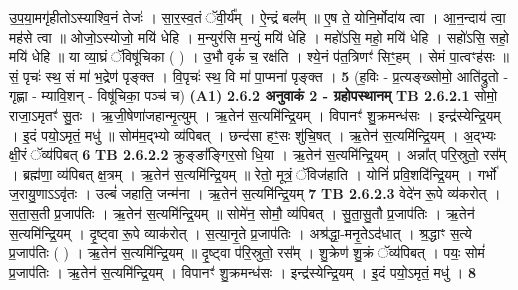 \documentclass[17pt]{extarticle}
\begin{document}
                  उ॒प॒या॒मगृ॑हीतोऽस्याश्वि॒नं तेजः॑ । सा॒र॒स्व॒तं ॅवी॒र्य᳚म् । ऐ॒न्द्रं बल᳚म् ॥ ए॒ष ते॒ योनि॒र्मोदा॑य त्वा । आ॒न॒न्दाय॑ त्वा॒ मह॑से त्वा ॥ ओजो॒ऽस्योजो॒ मयि॑ धेहि । म॒न्युर॑सि म॒न्युं मयि॑ धेहि । महो॑ऽसि॒ महो॒ मयि॑ धेहि । सहो॑ऽसि॒ सहो॒ मयि॑ धेहि ॥ या व्या॒घ्रं ॅविषू॑चिका ( ) । उ॒भौ वृकं॑ च॒ रक्ष॑ति । श्ये॒नं प॑त॒त्रिणꣳ॑ सिꣳ॒॒हम् । सेमं पा॒त्वꣳह॑सः ॥ सं॒ पृचः॑ स्थ॒ सं मा॑ भ॒द्रेण॑ पृङ्क्त । वि॒पृचः॑ स्थ॒ वि मा॑ पा॒प्मना॑ पृङ्क्त । \textbf{ 5} \newline
                  \newline
                                    (ह॒विः - प्र॒त्यङ्ख्सोमो॒ आति॑द्रुतो - गृह्णा - म्यावि॒शन् - विषू॑चिका॒ पञ्च॑ च) \textbf{(A1)} \newline \newline
                \textbf{ 2.6.2      अनुवाकं   2 - ग्रहोपस्थानम्} \newline
                                \textbf{ TB 2.6.2.1} \newline
                  सोमो॒ राजा॒ऽमृतꣳ॑ सु॒तः । ऋ॒जी॒षेणा॑जहान्मृ॒त्युम् । ऋ॒तेन॑ स॒त्यमि॑न्द्रि॒यम् । विपानꣳ॑ शु॒क्रमन्ध॑सः । इन्द्र॑स्येन्द्रि॒यम् । इ॒दं पयो॒ऽमृतं॒ मधु॑ ॥ सोम॑म॒द्भ्यो व्य॑पिबत् । छन्द॑सा हꣳ॒॒सः शु॑चि॒षत् । ऋ॒तेन॑ स॒त्यमि॑न्द्रि॒यम् । अ॒द्भ्यः क्षी॒रं ॅव्य॑पिबत् \textbf{ 6} \newline
                  \newline
                                \textbf{ TB 2.6.2.2} \newline
                  क्रुङ्ङा᳚ङ्गिर॒सो धि॒या । ऋ॒तेन॑ स॒त्यमि॑न्द्रि॒यम् । अन्ना᳚त् परि॒स्रुतो॒ रस᳚म् । ब्रह्म॑णा॒ व्य॑पिबत् क्ष॒त्रम् । ऋ॒तेन॑ स॒त्यमि॑न्द्रि॒यम् ॥ रेतो॒ मूत्रं॒ ॅविज॑हाति । योनिं॑ प्रवि॒शदि॑न्द्रि॒यम् । गर्भो॑ ज॒रायु॒णाऽऽवृ॑तः । उल्बं॑ जहाति॒ जन्म॑ना । ऋ॒तेन॑ स॒त्यमि॑न्द्रि॒यम् \textbf{ 7} \newline
                  \newline
                                \textbf{ TB 2.6.2.3} \newline
                  वेदे॑न रू॒पे व्य॑करोत् । स॒ता॒स॒ती प्र॒जाप॑तिः । ऋ॒तेन॑ स॒त्यमि॑न्द्रि॒यम् ॥ सोमे॑न॒ सोमौ॒ व्य॑पिबत् । सु॒ता॒सु॒तौ प्र॒जाप॑तिः । ऋ॒तेन॑ स॒त्यमि॑न्द्रि॒यम् । दृ॒ष्ट्वा रू॒पे व्याक॑रोत् । स॒त्या॒नृ॒ते प्र॒जाप॑तिः । अश्र॑द्धा॒-मनृ॒तेऽद॑धात् । श्र॒द्धाꣳ स॒त्ये प्र॒जाप॑तिः ( ) । ऋ॒तेन॑ स॒त्यमि॑न्द्रि॒यम् ॥ दृ॒ष्ट्वा प॑रि॒स्रुतो॒ रस᳚म् । शु॒क्रेण॑ शु॒क्रं ॅव्य॑पिबत् । पयः॒ सोमं॑ प्र॒जाप॑तिः । ऋ॒तेन॑ स॒त्यमि॑न्द्रि॒यम् । विपानꣳ॑ शु॒क्रमन्ध॑सः । इन्द्र॑स्येन्द्रि॒यम् । इ॒दं पयो॒ऽमृतं॒ मधु॑ । \textbf{ 8} \newline
\end{document}
